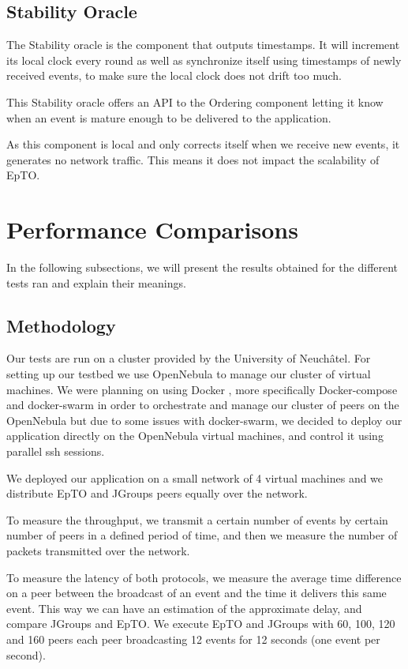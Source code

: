 \documentclass[10pt,conference,a4paper]{IEEEtran}
\begin{document}
\subsection{Stability Oracle}
The Stability oracle is the component that outputs timestamps. It will increment its local clock every round as well as synchronize itself using timestamps of newly received events, to make sure the local clock does not drift too much.
\par
This Stability oracle offers an API to the Ordering component letting it know when an event is mature enough to be delivered to the application.
\par
As this component is local and only corrects itself when we receive new events, it generates no network traffic. This means it does not impact the scalability of EpTO.
\section{Performance Comparisons}
In the following subsections, we will present the results obtained for the different tests ran and explain their meanings.
\subsection{Methodology}
\label{sub:metho}
Our tests are run on a cluster provided by the University of Neuchâtel. For setting up our testbed we use OpenNebula \autocite{opennebula} to manage our cluster of virtual machines. We were planning on using Docker \autocite{docker}, more specifically Docker-compose and docker-swarm in order to orchestrate and manage our cluster of peers on the OpenNebula but due to some issues with docker-swarm, we decided to deploy our application directly on the OpenNebula virtual machines, and control it using parallel ssh sessions.
\par
We deployed our application on a small network of 4 virtual machines and we distribute EpTO and JGroups peers equally over the network.
\par
To measure the throughput, we transmit a certain number of events by certain number of peers in a defined period of time, and then we measure the number of packets transmitted over the network.
\par
To measure the latency of both protocols, we measure the average time difference on a peer between the broadcast of an event and the time it delivers this same event. This way we can have an estimation of the approximate delay, and compare JGroups and EpTO.  We execute EpTO and JGroups with 60, 100, 120 and 160 peers each peer broadcasting 12 events for 12 seconds (one event per second).
\end{document}

